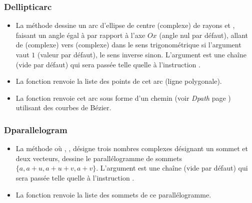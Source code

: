 \subsubsection{Dellipticarc}
\begin{itemize}
    \item La méthode  dessine un arc d'ellipse de centre  (complexe) de rayons  et , faisant un angle égal à  par rapport à l'axe \(Ox\) (angle nul par défaut), allant de  (complexe) vers  (complexe) dans le sens trigonométrique si l'argument  vaut $1$ (valeur par défaut), le sens inverse sinon. L'argument  est une chaîne (vide par défaut) qui sera passée telle quelle à l'instruction \drawcmd.
    \item La fonction  renvoie la liste des points de cet arc (ligne polygonale). 
    \item La fonction  renvoie cet arc sous forme d'un chemin (voir \emph{Dpath} page \pageref{Dpath}) utilisant des courbes de Bézier.
\end{itemize}

\subsubsection{Dparallelogram}
\begin{itemize}
    \item La méthode  où , ,  désigne trois nombres complexes désignant un sommet et deux vecteurs, dessine le parallélogramme de sommets $\{a,a+u,a+u+v,a+v\}$. L'argument  est une chaîne (vide par défaut) qui sera passée telle quelle à l'instruction \drawcmd.
    \item La fonction  renvoie la liste des sommets de ce parallélogramme.
\end{itemize}

